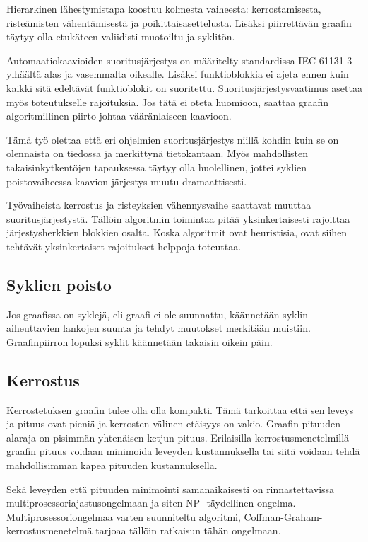 \documentclass[finnish,12pt]{article}
\begin{document}
Hierarkinen lähestymistapa koostuu kolmesta vaiheesta: kerrostamisesta,
risteämisten vähentämisestä ja poikittaisasettelusta. Lisäksi piirrettävän
graafin täytyy olla etukäteen valiidisti muotoiltu ja syklitön.

Automaatiokaavioiden suoritusjärjestys on määritelty standardissa IEC 61131-3
ylhäältä alas ja vasemmalta oikealle. Lisäksi funktioblokkia ei ajeta ennen
kuin kaikki sitä edeltävät funktioblokit on suoritettu.
Suoritusjärjestysvaatimus asettaa myös toteutukselle rajoituksia. Jos tätä ei oteta
huomioon, saattaa graafin algoritmillinen piirto johtaa vääränlaiseen kaavioon.

Tämä työ olettaa että eri ohjelmien suoritusjärjestys niillä kohdin kuin se on
olennaista on tiedossa ja merkittynä tietokantaan.
Myös mahdollisten takaisinkytkentöjen tapauksessa täytyy olla huolellinen, jottei syklien poistovaiheessa kaavion järjestys muutu dramaattisesti.

Työvaiheista kerrostus ja risteyksien vähennysvaihe saattavat muuttaa suoritusjärjestystä. Tällöin algoritmin toimintaa pitää yksinkertaisesti rajoittaa järjestysherkkien blokkien osalta. Koska algoritmit ovat heuristisia, ovat siihen tehtävät yksinkertaiset rajoitukset helppoja toteuttaa.

		\subsection{Syklien poisto}

Jos graafissa on syklejä, eli graafi ei ole suunnattu, käännetään syklin
aiheuttavien lankojen suunta ja tehdyt muutokset merkitään muistiin.
Graafinpiirron lopuksi syklit käännetään takaisin oikein päin.

		\subsection{Kerrostus}

Kerrostetuksen graafin tulee olla olla kompakti. Tämä tarkoittaa että sen leveys
ja pituus ovat pieniä ja kerrosten välinen etäisyys on vakio. Graafin pituuden
alaraja on pisimmän yhtenäisen ketjun pituus.
Erilaisilla kerrostusmenetelmillä graafin pituus voidaan
minimoida leveyden kustannuksella tai siitä voidaan tehdä mahdollisimman kapea
pituuden kustannuksella.

Sekä leveyden että pituuden minimointi samanaikaisesti on rinnastettavissa
multiprosessoriajastusongelmaan ja siten NP- täydellinen ongelma.
\cite{RefWorks:39} Multiprosessoriongelmaa varten suunniteltu algoritmi,
Coffman-Graham-kerrostusmenetelmä tarjoaa tällöin ratkaisun tähän ongelmaan.
\end{document}
